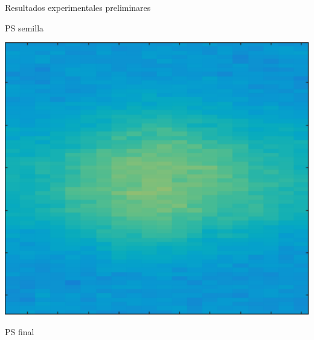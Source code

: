 \documentclass[fleqn,10pt]{beamer}
\begin{document}
\begin{frame}{Resultados experimentales preliminares}
\begin{minipage}{0.22\linewidth}
\begin{center}
{		PS semilla
		
		\includegraphics[width=0.8\linewidth]{AAUgraphics/pt4/exp_psf_at_seed}
		\vfill
		\pause
		
		PS final}
	

\end{center}
\end{minipage}
\end{frame}
\end{document}
